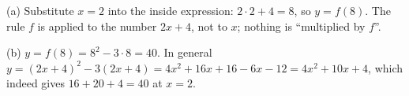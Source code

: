 (a) Substitute $x=2$ into the inside expression: $2\cdot2+4=8$, so $y=f(8)$. The rule $f$ is applied to the number $2x+4$, not to $x$; nothing is ``multiplied by $f$''.

(b) $y=f(8)=8^2-3\cdot8=\boxed{40}$. In general $y=(2x+4)^2-3(2x+4)=4x^2+16x+16-6x-12=\boxed{4x^2+10x+4}$, which indeed gives $16+20+4=40$ at $x=2$.
